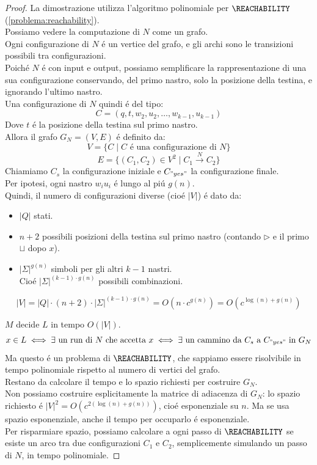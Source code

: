 \begin{proof}
La dimostrazione utilizza l'algoritmo polinomiale per $\REACHABILITY$ (\ref{problema:reachability}). \\
Possiamo vedere la computazione di $N$ come un grafo. \\
Ogni configurazione di $N$ é un vertice del grafo, 
e gli archi sono le transizioni possibili tra configurazioni. \\

Poiché $N$ é con input e output, 
possiamo semplificare la rappresentazione di una sua configurazione
conservando, del primo nastro, solo la posizione della testina,
e ignorando l'ultimo nastro. \\
Una configurazione di $N$ quindi é del tipo:
\[
C = (q, t, w_2, u_2, \dots, w_{k-1}, u_{k-1})
\]
Dove $t$ é la posizione della testina sul primo nastro. \\

Allora il grafo $G_N = (V, E)$ é definito da:
\[
V = \{C \mid C \text{ é una configurazione di } N\}
\]
\[
E = \{(C_1, C_2) \in V^2 \mid C_1 \xrightarrow{N} C_2\}
\]
Chiamiamo $C_s$ la configurazione iniziale e $C_{"yes"}$ la configurazione finale. \\

Per ipotesi, ogni nastro $w_i u_i$ é lungo al piú $g(n)$. \\
Quindi, il numero di configurazioni diverse (cioé $|V|$) é dato da:
\begin{itemize}
	\item $|Q|$ stati.
	\item $n+2$ possibili posizioni della testina sul primo nastro (contando $\triangleright$ e il primo $\sqcup$ dopo $x$).
	\item $|\Sigma|^{g(n)}$ simboli per gli altri $k-1$ nastri. \\ 
	Cioé $|\Sigma|^{(k-1) \cdot g(n)}$ possibili combinazioni. \\
\end{itemize}
\[
|V| = |Q| \cdot (n+2) \cdot |\Sigma|^{(k-1) \cdot g(n)} = O(n \cdot c^{g(n)}) = O(c^{\log(n) + g(n)})
\]

$M$ decide $L$ in tempo $O(|V|)$. \\
\[
x \in L \iff \exists \text{ un run di } N \text{ che accetta } x \iff \exists \text{ un cammino da } C_s \text{ a } C_{"yes"} \text{ in } G_N
\]
Ma questo é un problema di $\REACHABILITY$, che sappiamo essere risolvibile in tempo polinomiale rispetto al numero di vertici del grafo. \\

Restano da calcolare il tempo e lo spazio richiesti per costruire $G_N$. \\

Non possiamo costruire esplicitamente la matrice di adiacenza di $G_N$:
lo spazio richiesto é $|V|^2 = O(c^{2(\log(n) + g(n))})$, cioé esponenziale su $n$.
Ma se usa spazio esponenziale, anche il tempo per occuparlo é esponenziale. \\

Per risparmiare spazio, possiamo calcolare a ogni passo di $\REACHABILITY$ 
se esiste un arco tra due configurazioni $C_1$ e $C_2$,
semplicemente simulando un passo di $N$, in tempo polinomiale.
\end{proof}
